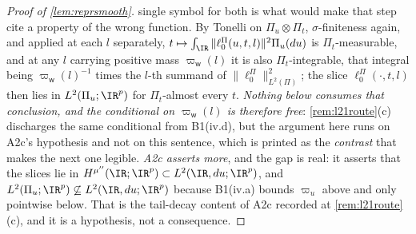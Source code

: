 \begin{proof}[Proof of \cref{lem:reprsmooth}]
single symbol for both is what would make that step cite a property of the wrong function.
By Tonelli on $\Pi_u\otimes\Pi_t$, $\sigma$-finiteness again, and applied at each $l$ separately, 
$t\mapsto\int_{\IR}\|\ell^\Pi_0(u,t,l)\|^{2}\Pi_u(du)$ is
$\Pi_t$-measurable, and at any $l$ carrying positive mass $\varpi_{\mathsf w}(l)$ it is also
$\Pi_t$-integrable, that integral being $\varpi_{\mathsf w}(l)^{-1}$ times the $l$-th summand of
$\|\ell^\Pi_0\|^{2}_{L^{2}(\Pi)}$; the slice
$\ell^\Pi_0(\cdot,t,l)$ then lies in $L^{2}(\Pi_u;\IR^{p})$ for $\Pi_t$-almost every $t$.
\emph{Nothing below consumes that conclusion, and the conditional on $\varpi_{\mathsf w}(l)$ is
therefore free}: \cref{rem:l21route}\textup{(c)} discharges the same conditional from B1(iv.d), but the
argument here runs on A2c's hypothesis and not on this sentence, which is printed as the
\emph{contrast} that makes the next one legible. \emph{A2c asserts more}, and the gap is real: it
asserts that the slices lie in $H^{\mu''}(\IR;\IR^{p})\subset L^{2}(\IR,du;\IR^{p})$, and
$L^{2}(\Pi_u;\IR^{p})\not\subseteq L^{2}(\IR,du;\IR^{p})$ because B1(iv.a) bounds $\varpi_u$ above and only pointwise
below. That is the tail-decay content of A2c recorded at \cref{rem:l21route}\textup{(c)}, and it is a
hypothesis, not a consequence.


\end{proof}
